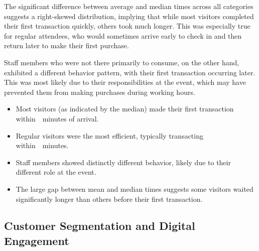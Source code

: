 The significant difference between average and median times across all categories suggests a right-skewed distribution, implying that while most visitors completed their first transaction quickly, others took much longer.
This was especially true for regular attendees, who would sometimes arrive early to check in and then return later to make their first purchase.

Staff members who were not there primarily to consume, on the other hand, exhibited a different behavior pattern, with their first transaction occurring later.
This was most likely due to their responsibilities at the event, which may have prevented them from making purchases during working hours.

\begin{keytakeaways}
	\begin{itemize}
		\item Most visitors (as indicated by the median) made their first transaction within~~minutes of arrival.
		\item Regular visitors were the most efficient, typically transacting within~~minutes.
		\item Staff members showed distinctly different behavior, likely due to their different role at the event.
		\item The large gap between mean and median times suggests some visitors waited significantly longer than others before their first transaction.
	\end{itemize}
\end{keytakeaways}

\subsection{Customer Segmentation and Digital Engagement}
\label{subsec:analysis-customer-segmentation-engagement}
\begin{rqbox}
	\textit{}
\end{rqbox}
\begin{rqbox}
	\textit{}
\end{rqbox}
\begin{rqbox}
	\textit{}
\end{rqbox}
\begin{rqbox}
	\textit{}
\end{rqbox}

